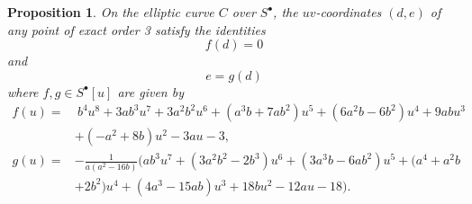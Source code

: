 \documentclass{gtpart}
\newtheorem{prop}[thm]{Proposition}
\theoremstyle{definition}
\theoremstyle{remark}
\newcommand{\s}{S^\bullet}
\begin{document}
\begin{prop}
\label{prop:tors}
 On the elliptic curve $C$ over $\s$, the $uv$-coordinates $(d,e)$ of 
 any point of exact order 3 satisfy the identities 
 \begin{equation}
 \label{f}
  f(d) = 0 
 \end{equation}
 and 
 \begin{equation}
 \label{g}
  e = g(d) 
 \end{equation}
 where $f, g \in \s [u]$ are given by 
 \begin{equation*}
 \begin{split}
  f(u) = & ~ b^4 u^8 + 3 a b^3 u^7 + 3 a^2 b^2 u^6 + (a^3 b + 7 a b^2) u^5 + (6 a^2 b - 6 b^2) u^4 + 9 a b u^3 \\
         & + (-a^2 + 8 b) u^2 - 3 a u - 3, \\
  g(u) = & -\frac{1}{a (a^2 - 16 b)} \big( a b^3 u^7 + (3 a^2 b^2 - 2 b^3) u^6 + (3 a^3 b -6 a b^2) u^5 + (a^4 + a^2 b \\
         & + 2 b^2) u^4 + (4 a^3 - 15 a b) u^3 + 18 b u^2 - 12 a u - 18 \big).  
 \end{split}
 \end{equation*}
\end{prop}
\end{document}
